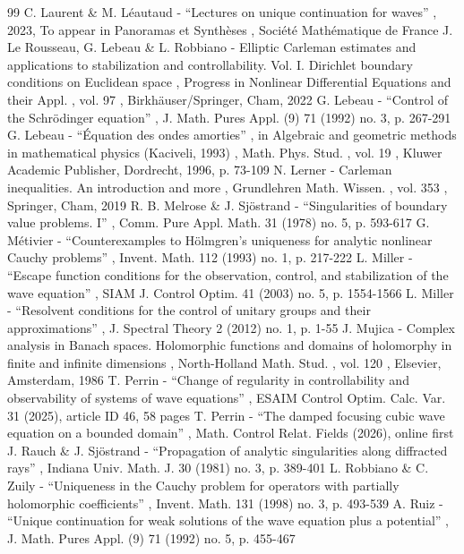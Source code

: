 \documentclass[11pt]{article}
\theoremstyle{definition}
\begin{document}
\begin{thebibliography}{99}
 C. Laurent \& M. Léautaud - “Lectures on unique continuation for waves” , 2023, To appear in Panoramas et Synthèses , Société Mathématique de France
 J. Le Rousseau, G. Lebeau \& L. Robbiano - Elliptic Carleman estimates and applications to stabilization and controllability. Vol. I. Dirichlet boundary conditions on Euclidean space , Progress in Nonlinear Differential Equations and their Appl. , vol. 97 , Birkhäuser/Springer, Cham, 2022
 G. Lebeau - “Control of the Schrödinger equation” , J. Math. Pures Appl. (9) 71 (1992) no. 3, p. 267-291
 G. Lebeau - “Équation des ondes amorties” , in Algebraic and geometric methods in mathematical physics (Kaciveli, 1993) , Math. Phys. Stud. , vol. 19 , Kluwer Academic Publisher, Dordrecht, 1996, p. 73-109
 N. Lerner - Carleman inequalities. An introduction and more , Grundlehren Math. Wissen. , vol. 353 , Springer, Cham, 2019
 R. B. Melrose \& J. Sjöstrand - “Singularities of boundary value problems. I” , Comm. Pure Appl. Math. 31 (1978) no. 5, p. 593-617
 G. Métivier - “Counterexamples to Hölmgren’s uniqueness for analytic nonlinear Cauchy problems” , Invent. Math. 112 (1993) no. 1, p. 217-222
 L. Miller - “Escape function conditions for the observation, control, and stabilization of the wave equation” , SIAM J. Control Optim. 41 (2003) no. 5, p. 1554-1566
 L. Miller - “Resolvent conditions for the control of unitary groups and their approximations” , J. Spectral Theory 2 (2012) no. 1, p. 1-55
 J. Mujica - Complex analysis in Banach spaces. Holomorphic functions and domains of holomorphy in finite and infinite dimensions , North-Holland Math. Stud. , vol. 120 , Elsevier, Amsterdam, 1986
 T. Perrin - “Change of regularity in controllability and observability of systems of wave equations” , ESAIM Control Optim. Calc. Var. 31 (2025), article ID 46, 58 pages
 T. Perrin - “The damped focusing cubic wave equation on a bounded domain” , Math. Control Relat. Fields (2026), online first
 J. Rauch \& J. Sjöstrand - “Propagation of analytic singularities along diffracted rays” , Indiana Univ. Math. J. 30 (1981) no. 3, p. 389-401
 L. Robbiano \& C. Zuily - “Uniqueness in the Cauchy problem for operators with partially holomorphic coefficients” , Invent. Math. 131 (1998) no. 3, p. 493-539
 A. Ruiz - “Unique continuation for weak solutions of the wave equation plus a potential” , J. Math. Pures Appl. (9) 71 (1992) no. 5, p. 455-467

\end{thebibliography}
\end{document}
